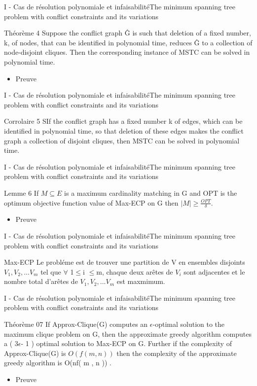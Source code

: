 \documentclass[14pt,aspectratio=169]{beamer}
\newcommand{\TT}{The minimum spanning tree problem with conflict constraints and its variations}
\newcommand{\PI}{I - Cas de résolution polynomiale et infaisabilité}
\begin{document}
\begin{frame}{\PI}{\TT}
 \begin{block}{Théorème 4}
Suppose the conflict graph Ĝ is such that deletion of a fixed number, k, of nodes, that can be identified in polynomial time, reduces Ĝ to a collection of node-disjoint cliques. Then the corresponding instance of MSTC can be solved in polynomial time.
 \end{block}
 \begin{itemize}
     \item Preuve
 \end{itemize}

\end{frame}

\begin{frame}{\PI}{\TT}
 \begin{block}{Corrolaire 5}
SIf the conflict graph has a fixed number k of edges, which can be identified in polynomial time, so that deletion of these edges makes the conflict graph a collection of disjoint cliques, then MSTC can be solved in polynomial time.
 \end{block}
\end{frame}

 \begin{frame}{\PI}{\TT}
 \begin{block}{Lemme 6}
If $ M \subseteq E $ is a maximum cardinality matching in G and OPT is the optimum objective function value of Max-ECP on G then $|M| \geqslant \frac{OPT}{\delta}$.
 \end{block}
 \begin{itemize}
     \item Preuve
 \end{itemize}
\end{frame}

 \begin{frame}{\PI}{\TT}
 \begin{block}{Max-ECP}
Le probléme est de trouver une partition de V en ensembles disjoints $V_{1}, V_{2},...V_{m}$ tel que $\forall$ 1$\leq$i $\leq$m, chaque deux arêtes de $V_{i}$ sont adjacentes et le nombre total d'arêtes de $V_{1}, V_{2},...V_{m}$ est maxmimum.
 \end{block}
\end{frame}

 \begin{frame}{\PI}{\TT}
 \begin{block}{Théorème 07}
If Approx-Clique(G) computes an $\epsilon$-optimal solution to the maximum clique problem on G, then the approximate greedy algorithm computes a ( 3$\epsilon $- 1 ) optimal solution to Max-ECP on G. Further if the complexity of Approx-Clique(G) is $O ( f ( m , n ))$ then the complexity of the approximate greedy algorithm is O(nf( m , n )) .
 \end{block}
 \begin{itemize}
     \item Preuve
 \end{itemize}
\end{frame}
\end{document}
